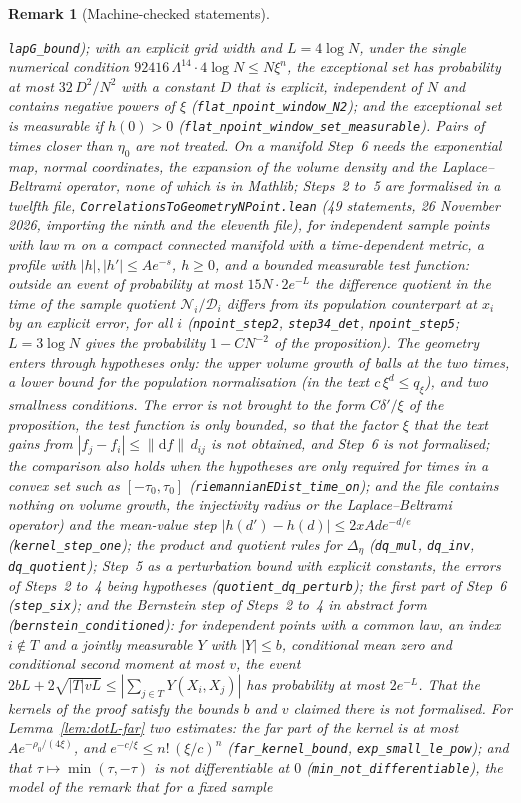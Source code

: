 \documentclass[11pt,a4paper]{article}
\theoremstyle{stmt}
\theoremstyle{defn}
\theoremstyle{rmk}
\newtheorem{remark}[theorem]{Remark}
\numberwithin{equation}{section}
\newcommand{\dd}{\mathrm{d}}
\begin{document}
{\begin{remark}[Machine-checked statements]
\begin{itemize}
\texttt{lapG\_bound}); with an explicit grid width and $L=4\log N$, under the single numerical condition $92416\,\Lambda^{14}\cdot4\log N\le N\xi^n$, the exceptional set has probability at most $32\,D^2/N^2$ with a constant $D$ that is explicit, independent of $N$ and contains negative powers of $\xi$ (\texttt{flat\_npoint\_window\_N2}); and the exceptional set is measurable if $h(0)>0$ (\texttt{flat\_npoint\_window\_set\_measurable}). Pairs of times closer than $\eta_0$ are not treated. On a manifold Step~6 needs the exponential map, normal coordinates, the expansion of the volume density and the Laplace--Beltrami operator, none of which is in Mathlib; Steps~2 to~5 are formalised in a twelfth file, \texttt{CorrelationsToGeometryNPoint.lean} (49 statements, 26 November 2026, importing the ninth and the eleventh file), for independent sample points with law $m$ on a compact connected manifold with a time-dependent metric, a profile with $|h|,|h'|\le Ae^{-s}$, $h\ge0$, and a bounded measurable test function: outside an event of probability at most $15N\cdot2e^{-L}$ the difference quotient in the time of the sample quotient $\mathcal N_i/\mathcal D_i$ differs from its population counterpart at $x_i$ by an explicit error, for all $i$ (\texttt{npoint\_step2}, \texttt{step34\_det}, \texttt{npoint\_step5}; $L=3\log N$ gives the probability $1-CN^{-2}$ of the proposition). The geometry enters through hypotheses only: the upper volume growth of balls at the two times, a lower bound for the population normalisation (in the text $c\,\xi^d\le q_\xi$), and two smallness conditions. The error is not brought to the form $C\delta'/\xi$ of the proposition, the test function is only bounded, so that the factor $\xi$ that the text gains from $|f_j-f_i|\le\|\dd f\|\,d_{ij}$ is not obtained, and Step~6 is not formalised; the comparison also holds when the hypotheses are only required for times in a convex set such as $[-\tau_0,\tau_0]$ (\texttt{riemannianEDist\_time\_on}); and the file contains nothing on volume growth, the injectivity radius or the Laplace--Beltrami operator) and the mean-value step $|h(d')-h(d)|\le2xAde^{-d/e}$ (\texttt{kernel\_step\_one}); the product and quotient rules for $\Delta_\eta$ (\texttt{dq\_mul}, \texttt{dq\_inv}, \texttt{dq\_quotient}); Step~5 as a perturbation bound with explicit constants, the errors of Steps~2 to~4 being hypotheses (\texttt{quotient\_dq\_perturb}); the first part of Step~6 (\texttt{step\_six}); and the Bernstein step of Steps~2 to~4 in abstract form (\texttt{bernstein\_conditioned}): for independent points with a common law, an index $i\notin T$ and a jointly measurable $Y$ with $|Y|\le b$, conditional mean zero and conditional second moment at most $v$, the event $2bL+2\sqrt{|T|vL}\le|\sum_{j\in T}Y(X_i,X_j)|$ has probability at most $2e^{-L}$. That the kernels of the proof satisfy the bounds $b$ and $v$ claimed there is not formalised. For Lemma~\ref{lem:dotL-far} two estimates: the far part of the kernel is at most $Ae^{-\rho_0/(4\xi)}$, and $e^{-c/\xi}\le n!\,(\xi/c)^n$ (\texttt{far\_kernel\_bound}, \texttt{exp\_small\_le\_pow}); and that $\tau\mapsto\min(\tau,-\tau)$ is not differentiable at $0$ (\texttt{min\_not\_differentiable}), the model of the remark that for a fixed sample 
\end{itemize}
\end{remark}}
\end{document}
